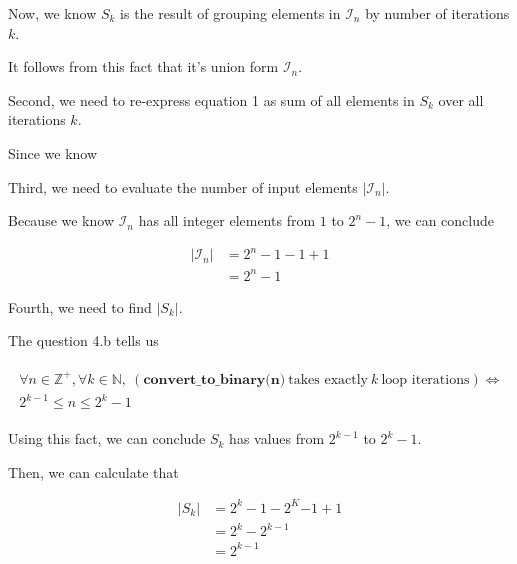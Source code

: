 \documentclass[12pt]{article}
\begin{document}
\begin{enumerate}[a.]
    \bigskip

    Now, we know $S_k$ is the result of grouping elements in $\mathcal{I}_n$
    by number of iterations $k$.

    \bigskip

    It follows from this fact that it's union form $\mathcal{I}_n$.

    \bigskip

    Second, we need to re-express equation 1 as sum of all elements in $S_k$ over all iterations $k$.

    \bigskip

    Since we know

    \bigskip

    Third, we need to evaluate the number of input elements $\lvert \mathcal{I}_n \rvert$.

    \bigskip

    Because we know $\mathcal{I}_n$ has all integer elements from $1$ to $2^n - 1$,
    we can conclude

    \begin{align}
        \lvert \mathcal{I}_n \rvert &= 2^n - 1 - 1 + 1\\
        &= 2^n - 1
    \end{align}

    \bigskip

    Fourth, we need to find $\lvert S_k \rvert$.

    \bigskip

    The question 4.b tells us

    \begin{align}
        \begin{split}
        \forall n \in \mathbb{Z}^+, \forall k \in \mathbb{N},\: (\textbf{
        convert\_to\_binary(n)}\:\text{takes exactly}\:k\:\text{loop iterations}) \Leftrightarrow
        \\ 2^{k-1} \leq n \leq 2^k -1
        \end{split}
    \end{align}

    \bigskip

    Using this fact, we can conclude $S_k$ has values from $2^{k-1}$ to $2^k - 1$.

    \bigskip

    Then, we can calculate that

    \begin{align}
        \lvert S_k \rvert &= 2^k -1 - 2^K{-1} + 1\\
        &= 2^k - 2^{k-1}\\
        &= 2^{k-1}
    \end{align}


\end{enumerate}
\end{document}
